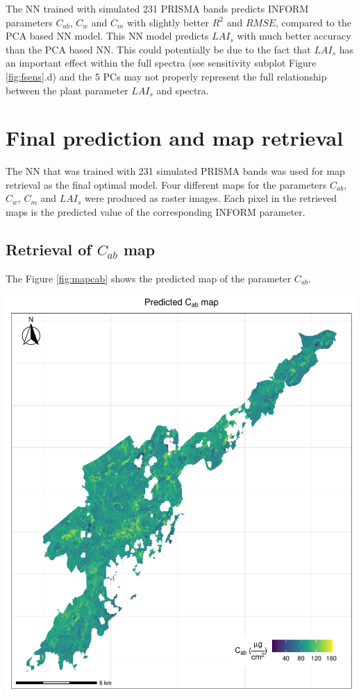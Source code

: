 \documentclass[a4paper, twoside]{templates/ociamthesis}
\let\origfigure\figure
\let\endorigfigure\endfigure
\renewenvironment{figure}[1][2] {
    \expandafter\origfigure\expandafter[H]
} {
    \endorigfigure
}
\begin{document}
The NN trained with simulated 231 PRISMA bands predicts INFORM parameters \(C_{ab}\), \(C_{w}\) and \(C_{m}\) with slightly better \(R^{2}\) and \(RMSE\), compared to the PCA based NN model. This NN model predicts \(LAI_{s}\) with much better accuracy than the PCA based NN. This could potentially be due to the fact that \(LAI_{s}\) has an important effect within the full spectra (see sensitivity subplot Figure \ref{fig:fsens}.d) and the 5 PCs may not properly represent the full relationship between the plant parameter \(LAI_{s}\) and spectra.

\hypertarget{final-prediction-and-map-retrieval-1}{%
\section{Final prediction and map retrieval}\label{final-prediction-and-map-retrieval-1}}

The NN that was trained with 231 simulated PRISMA bands was used for map retrieval as the final optimal model. Four different maps for the parameters \(C_{ab}\), \(C_{w}\), \(C_{m}\) and \(LAI_{s}\) were produced as raster images. Each pixel in the retrieved maps is the predicted value of the corresponding INFORM parameter.

\hypertarget{retrieval-of-c_ab-map}{%
\subsection{\texorpdfstring{Retrieval of \(C_{ab}\) map}{Retrieval of C\_\{ab\} map}}\label{retrieval-of-c_ab-map}}

The Figure \ref{fig:mapcab} shows the predicted map of the parameter \(C_{ab}\).

\begin{figure}
\includegraphics[width=0.9\linewidth]{./figures/cab_map} \caption{Predicted map of the parameter $C_{ab}$}\label{fig:mapcab}
\end{figure}
\end{document}
